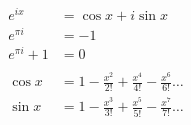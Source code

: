 \documentclass[letterpaper, landscape]{exam}
\begin{document}
  \begin{align*}
    e^{ix}        & = \cos x + i \sin x \\
    e^{\pi i}     & = -1 \\
    e^{\pi i} + 1 & = 0 \\
    \\
    \cos x & = 1 - \frac{x^2}{2!} + \frac{x^4}{4!} - \frac{x^6}{6!} \dots \\
    \sin x & = 1 - \frac{x^3}{3!} + \frac{x^5}{5!} - \frac{x^7}{7!} \dots \\
  \end{align*}
\end{document}
